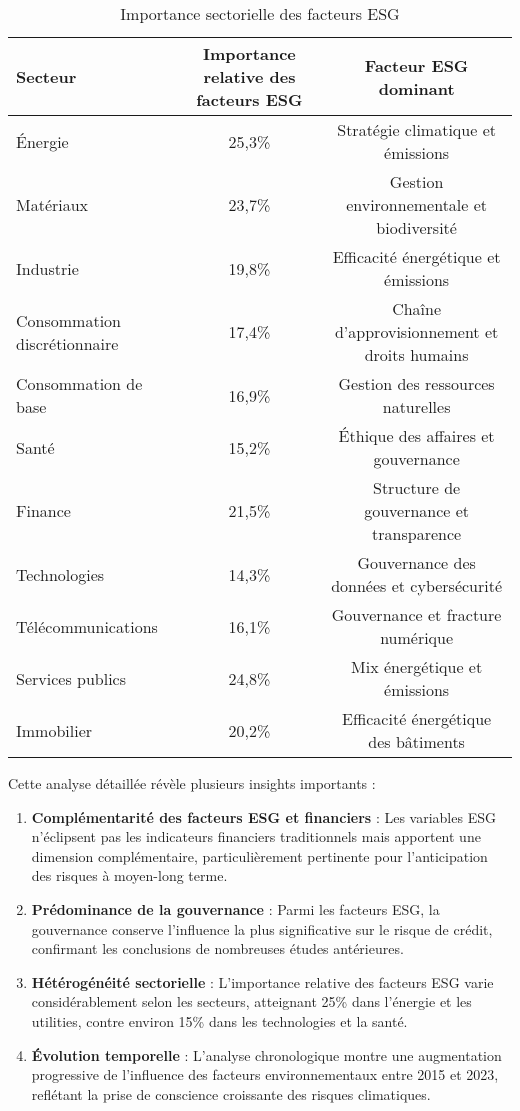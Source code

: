 \begin{table}[htbp]
  \centering
  \caption{Importance sectorielle des facteurs ESG}
  \begin{tabular}{lcc}
    \toprule
    \textbf{Secteur} & \textbf{Importance relative des facteurs ESG} & \textbf{Facteur ESG dominant} \\
    \midrule
    Énergie & 25,3\% & Stratégie climatique et émissions \\
    Matériaux & 23,7\% & Gestion environnementale et biodiversité \\
    Industrie & 19,8\% & Efficacité énergétique et émissions \\
    Consommation discrétionnaire & 17,4\% & Chaîne d'approvisionnement et droits humains \\
    Consommation de base & 16,9\% & Gestion des ressources naturelles \\
    Santé & 15,2\% & Éthique des affaires et gouvernance \\
    Finance & 21,5\% & Structure de gouvernance et transparence \\
    Technologies & 14,3\% & Gouvernance des données et cybersécurité \\
    Télécommunications & 16,1\% & Gouvernance et fracture numérique \\
    Services publics & 24,8\% & Mix énergétique et émissions \\
    Immobilier & 20,2\% & Efficacité énergétique des bâtiments \\
    \bottomrule
  \end{tabular}
\end{table}

Cette analyse détaillée révèle plusieurs insights importants :

\begin{enumerate}
  \item \textbf{Complémentarité des facteurs ESG et financiers} : Les variables ESG n'éclipsent pas les indicateurs financiers traditionnels mais apportent une dimension complémentaire, particulièrement pertinente pour l'anticipation des risques à moyen-long terme.

  \item \textbf{Prédominance de la gouvernance} : Parmi les facteurs ESG, la gouvernance conserve l'influence la plus significative sur le risque de crédit, confirmant les conclusions de nombreuses études antérieures.

  \item \textbf{Hétérogénéité sectorielle} : L'importance relative des facteurs ESG varie considérablement selon les secteurs, atteignant 25\% dans l'énergie et les utilities, contre environ 15\% dans les technologies et la santé.

  \item \textbf{Évolution temporelle} : L'analyse chronologique montre une augmentation progressive de l'influence des facteurs environnementaux entre 2015 et 2023, reflétant la prise de conscience croissante des risques climatiques.
\end{enumerate}

